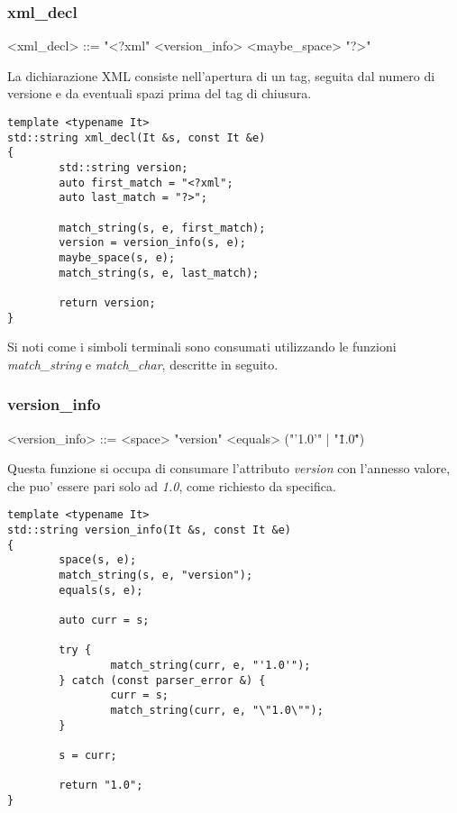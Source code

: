 \documentclass[italian,a4paper]{article}
\begin{document}
\subsubsection{xml\_decl}

\begin{grammar}
	<xml\_decl> ::= "<?xml" <version\_info> <maybe\_space> "?>"
\end{grammar}

La dichiarazione XML consiste nell'apertura di un tag, seguita dal numero di
versione e da eventuali spazi prima del tag di chiusura.

\begin{verbatim}
template <typename It>
std::string xml_decl(It &s, const It &e)
{
        std::string version;
        auto first_match = "<?xml";
        auto last_match = "?>";

        match_string(s, e, first_match);
        version = version_info(s, e);
        maybe_space(s, e);
        match_string(s, e, last_match);

        return version;
}
\end{verbatim}

Si noti come i simboli terminali sono consumati utilizzando le funzioni
\emph{match\_string} e \emph{match\_char}, descritte in seguito.

\subsubsection{version\_info}

\begin{grammar}
	<version\_info> ::= <space> "version" <equals> ("'1.0'" | "\"1.0\"")
\end{grammar}

Questa funzione si occupa di consumare l'attributo \emph{version} con l'annesso
valore, che puo' essere pari solo ad \emph{1.0}, come richiesto da specifica.

\begin{verbatim}
template <typename It>
std::string version_info(It &s, const It &e)
{
        space(s, e);
        match_string(s, e, "version");
        equals(s, e);

        auto curr = s;

        try {
                match_string(curr, e, "'1.0'");
        } catch (const parser_error &) {
                curr = s;
                match_string(curr, e, "\"1.0\"");
        }

        s = curr;

        return "1.0";
}
\end{verbatim}
\end{document}
